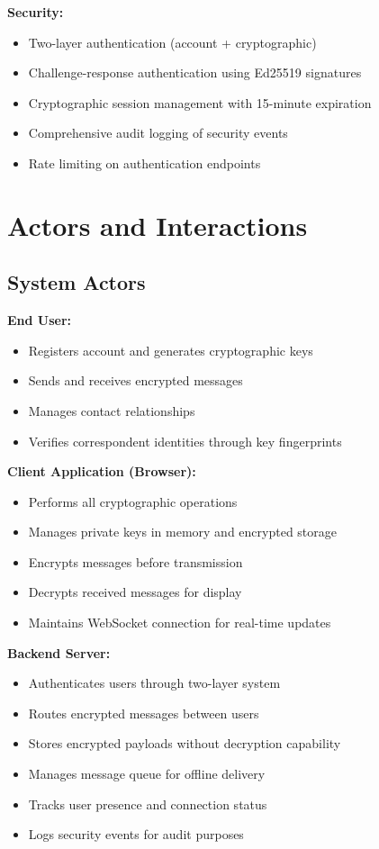\textbf{Security:}
\begin{itemize}
    \item Two-layer authentication (account + cryptographic)
    \item Challenge-response authentication using Ed25519 signatures
    \item Cryptographic session management with 15-minute expiration
    \item Comprehensive audit logging of security events
    \item Rate limiting on authentication endpoints
\end{itemize}

\section{Actors and Interactions}

\subsection{System Actors}

\textbf{End User:}
\begin{itemize}
    \item Registers account and generates cryptographic keys
    \item Sends and receives encrypted messages
    \item Manages contact relationships
    \item Verifies correspondent identities through key fingerprints
\end{itemize}

\textbf{Client Application (Browser):}
\begin{itemize}
    \item Performs all cryptographic operations
    \item Manages private keys in memory and encrypted storage
    \item Encrypts messages before transmission
    \item Decrypts received messages for display
    \item Maintains WebSocket connection for real-time updates
\end{itemize}

\textbf{Backend Server:}
\begin{itemize}
    \item Authenticates users through two-layer system
    \item Routes encrypted messages between users
    \item Stores encrypted payloads without decryption capability
    \item Manages message queue for offline delivery
    \item Tracks user presence and connection status
    \item Logs security events for audit purposes
\end{itemize}

